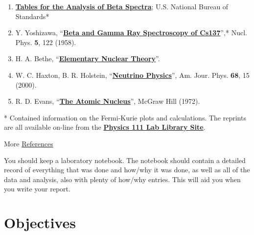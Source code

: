 \documentclass{../lab}
\begin{document}
\begin{enumerate}
    \item \href{http://physics111.lib.berkeley.edu/Physics111/Reprints/BRA/04-Table\_for\_Analysis\_of\_Beta\_Spectra.pdf}{\textbf{Tables for the Analysis of Beta Spectra}}; U.S. National Bureau of Standards*

    \item Y. Yoshizawa, ``\href{http://physics111.lib.berkeley.edu/Physics111/Reprints/BRA/Yoshizawa_beta&gammarayspecofCs137.pdf}{\textbf{Beta and Gamma Ray Spectroscopy of Cs137}}'',* Nucl. Phys. \textbf{5}, 122 (1958).

    \item H. A. Bethe, ``\href{http://physics111.lib.berkeley.edu/Physics111/Reprints/BRA/05-Elementary\_Nuclear\_Theory.pdf}{\textbf{Elementary Nuclear Theory}}''.

    \item W. C. Haxton, B. R. Holstein, ``\href{http://physics111.lib.berkeley.edu/Physics111/Reprints/BRA/BRA(state\%20of\%20the\%20science\%20and\%20art\%20of\%20beta\%20decay_OCR\%20.pdf}{\textbf{Neutrino Physics}}'', Am. Jour. Phys. \textbf{68}, 15 (2000).

    \item R. D. Evans, ``\href{http://physics111.lib.berkeley.edu/Physics111/Reprints/R.D.Evans\%20Atomic\%20Nucleus/The\%20Atomic\%20Nucleus\%20Evans\%20full\%20text.pdf}{\textbf{The Atomic Nucleus}}'', McGraw Hill (1972).

\end{enumerate}

* Contained information on the Fermi-Kurie plots and calculations. The reprints are all available on-line from the \href{http://physics111.lib.berkeley.edu/Physics111/Reprints/BRA/BRA\_index.html}{\textbf{Physics 111 Lab Library Site}}.

More \hyperref[sec:References]{References}

You should keep a laboratory notebook. The notebook should contain a detailed record of everything that was done and how/why it was done, as well as all of the data and analysis, also with plenty of how/why entries. This will aid you when you write your report.

\section{Objectives}
\end{document}
